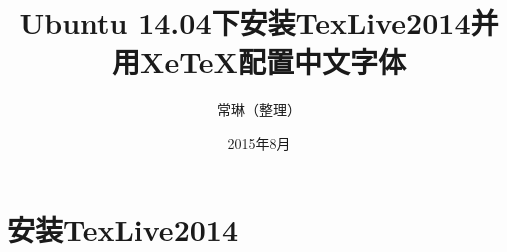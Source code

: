 \documentclass[12pt]{article}
\begin{document}
\title{\vspace{-2em}Ubuntu 14.04下安装TexLive2014并用XeTeX配置中文字体\vspace{-0.7em}}
\author{常琳（整理）}
\date{\vspace{-0.7em}2015年8月\vspace{-0.7em}}
\maketitle\thispagestyle{fancy}
\maketitle
\tableofcontents 

\section{安装TexLive2014}
\end{document}
